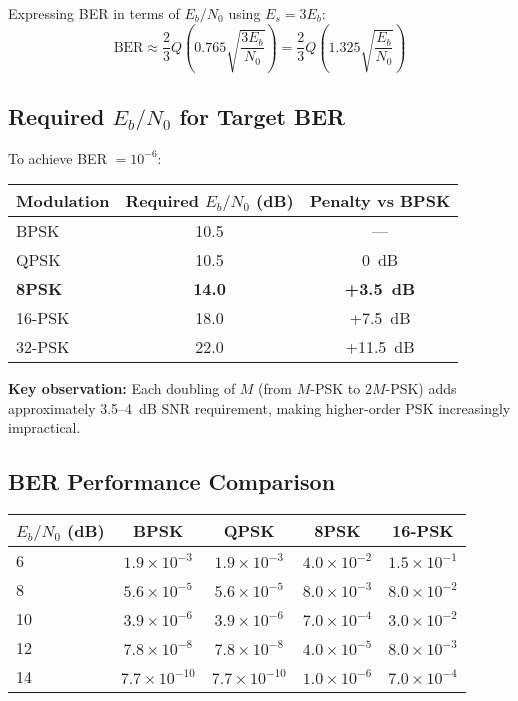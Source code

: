 Expressing BER in terms of $E_b/N_0$ using $E_s = 3E_b$:
\begin{equation}
\mathrm{BER} \approx \frac{2}{3}Q\left(0.765\sqrt{\frac{3E_b}{N_0}}\right) = \frac{2}{3}Q\left(1.325\sqrt{\frac{E_b}{N_0}}\right)
\end{equation}

\subsection{Required $E_b/N_0$ for Target BER}

To achieve BER $= 10^{-6}$:

\begin{center}
\begin{tabular}{@{}lcc@{}}
\toprule
Modulation & Required $E_b/N_0$ (dB) & Penalty vs BPSK \\
\midrule
BPSK & 10.5 & --- \\
QPSK & 10.5 & 0~dB \\
\textbf{8PSK} & \textbf{14.0} & \textbf{+3.5~dB} \\
16-PSK & 18.0 & +7.5~dB \\
32-PSK & 22.0 & +11.5~dB \\
\bottomrule
\end{tabular}
\end{center}

\textbf{Key observation:} Each doubling of $M$ (from $M$-PSK to $2M$-PSK) adds approximately 3.5--4~dB SNR requirement, making higher-order PSK increasingly impractical.

\subsection{BER Performance Comparison}

\begin{center}
\begin{tabularx}{\textwidth}{@{}Xcccc@{}}
\toprule
$E_b/N_0$ (dB) & BPSK & QPSK & 8PSK & 16-PSK \\
\midrule
6 & $1.9 \times 10^{-3}$ & $1.9 \times 10^{-3}$ & $4.0 \times 10^{-2}$ & $1.5 \times 10^{-1}$ \\
8 & $5.6 \times 10^{-5}$ & $5.6 \times 10^{-5}$ & $8.0 \times 10^{-3}$ & $8.0 \times 10^{-2}$ \\
10 & $3.9 \times 10^{-6}$ & $3.9 \times 10^{-6}$ & $7.0 \times 10^{-4}$ & $3.0 \times 10^{-2}$ \\
12 & $7.8 \times 10^{-8}$ & $7.8 \times 10^{-8}$ & $4.0 \times 10^{-5}$ & $8.0 \times 10^{-3}$ \\
14 & $7.7 \times 10^{-10}$ & $7.7 \times 10^{-10}$ & $1.0 \times 10^{-6}$ & $7.0 \times 10^{-4}$ \\
\bottomrule
\end{tabularx}
\end{center}

